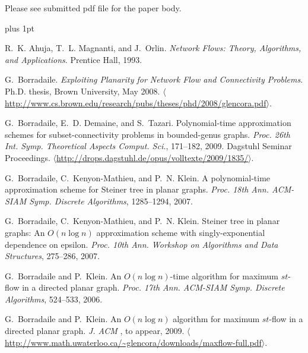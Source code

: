 \documentclass{sig-alternate}
\begin{document}





\begin{center}\Huge\sf
Please see submitted pdf file for the paper body.
\end{center}




\def\burl#1{$\langle$\url{#1}$\rangle$}
\begin{thebibliography}{10}
\itemsep 1pt plus 1pt

R.~K. Ahuja, T.~L. Magnanti, and J.~Orlin.
\newblock \emph{Network Flows: Theory, Algorithms, and Applications}.
\newblock Prentice Hall, 1993.

G.~Borradaile.
\newblock \emph{Exploiting Planarity for Network Flow and Connectivity
  Problems}.
\newblock Ph.D. thesis, Brown University, May 2008.
\newblock
  \burl{http://www.cs.brown.edu/research/pubs/theses/phd/2008/glencora.pdf}.

G.~Borradaile, E.~D. Demaine, and S.~Tazari.
\newblock Polynomial-time approximation schemes for subset-connectivity
  problems in bounded-genus graphs.
\newblock \emph{Proc. 26th Int. Symp. Theoretical Aspects Comput. Sci.},
  171--182, 2009. Dagstuhl Seminar Proceedings.
\newblock \burl{http://drops.dagstuhl.de/opus/volltexte/2009/1835/}.

G.~Borradaile, C.~Kenyon-Mathieu, and P.~N. Klein.
\newblock A polynomial-time approximation scheme for {Steiner} tree in planar
  graphs.
\newblock \emph{Proc. 18th Ann. ACM-SIAM Symp. Discrete Algorithms},
  1285--1294, 2007.

G.~Borradaile, C.~Kenyon-Mathieu, and P.~N. Klein.
\newblock Steiner tree in planar graphs: {An} {$O(n \log n)$} approximation
  scheme with singly-exponential dependence on epsilon.
\newblock \emph{Proc. 10th Ann. Workshop on Algorithms and Data Structures},
  275--286, 2007.

G.~Borradaile and P.~Klein.
\newblock An {$O(n \log n)$}-time algorithm for maximum $st$-flow in a directed
  planar graph.
\newblock \emph{Proc. 17th Ann. ACM-SIAM Symp. Discrete Algorithms}, 524--533,
  2006.

G.~Borradaile and P.~Klein.
\newblock An {$O(n\log n)$} algorithm for maximum $st$-flow in a directed
  planar graph.
\newblock \emph{J. ACM} $\!\!$, to appear, 2009.
\newblock
  \burl{http://www.math.uwaterloo.ca/~glencora/downloads/maxflow-full.pdf}.


\end{thebibliography}
\end{document}
